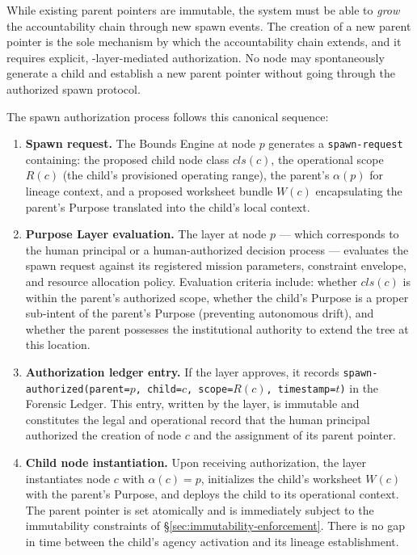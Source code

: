 While existing parent pointers are immutable, the system must be able to \emph{grow} the accountability chain through new spawn events. The creation of a new parent pointer is the sole mechanism by which the accountability chain extends, and it requires explicit, \purpose{}-layer-mediated authorization. No node may spontaneously generate a child and establish a new parent pointer without going through the authorized spawn protocol.

The spawn authorization process follows this canonical sequence:

\begin{enumerate}
\item[$\mathbf{S_1}$] \textbf{Spawn request.} The Bounds Engine at node $p$ generates a \texttt{spawn-request} containing: the proposed child node class $cls(c)$, the operational scope $R(c)$ (the child's provisioned operating range), the parent's $\alpha(p)$ for lineage context, and a proposed worksheet bundle $W(c)$ encapsulating the parent's Purpose translated into the child's local context.

\item[$\mathbf{S_2}$] \textbf{Purpose Layer evaluation.} The \purpose{} layer at node $p$ — which corresponds to the human principal or a human-authorized decision process — evaluates the spawn request against its registered mission parameters, constraint envelope, and resource allocation policy. Evaluation criteria include: whether $cls(c)$ is within the parent's authorized scope, whether the child's Purpose is a proper sub-intent of the parent's Purpose (preventing autonomous drift), and whether the parent possesses the institutional authority to extend the tree at this location.

\item[$\mathbf{S_3}$] \textbf{Authorization ledger entry.} If the \purpose{} layer approves, it records \texttt{spawn-authorized(parent=$p$, child=$c$, scope=$R(c)$, timestamp=$t$)} in the Forensic Ledger. This entry, written by the \fact{} layer, is immutable and constitutes the legal and operational record that the human principal authorized the creation of node $c$ and the assignment of its parent pointer.

\item[$\mathbf{S_4}$] \textbf{Child node instantiation.} Upon receiving authorization, the \fact{} layer instantiates node $c$ with $\alpha(c) = p$, initializes the child's worksheet $W(c)$ with the parent's Purpose, and deploys the child to its operational context. The parent pointer is set atomically and is immediately subject to the immutability constraints of \S\ref{sec:immutability-enforcement}. There is no gap in time between the child's agency activation and its lineage establishment.
\end{enumerate}

